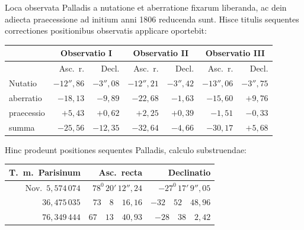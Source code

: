Loca observata Palladis a nutatione et aberratione fixarum liberanda, ac dein adiecta praecessione ad initium anni 1806 reducenda sunt. Hisce titulis sequentes correctiones positionibus observatis applicare oportebit:
\begin{center}
\begingroup\footnotesize\setlength{\tabcolsep}{4pt}\renewcommand{\arraystretch}{1.2}
\begin{tabular}{|l|r|r||r|r||r|r|}\hline
& \multicolumn{2}{c||}{Observatio I} & \multicolumn{2}{c||}{Observatio II} & \multicolumn{2}{c|}{Observatio III}\\\hline
& Asc.\ r. & Decl. & Asc.\ r. & Decl. & Asc.\ r. & Decl.\\\hline
Nutatio & $-12''{,}86$ & $-3''{,}08$ & $-12''{,}21$ & $-3''{,}42$ & $-13''{,}06$ & $-3''{,}75$\\
aberratio & $-18{,}13$ & $-9{,}89$ & $-22{,}68$ & $-1{,}63$ & $-15{,}60$ & $+9{,}76$\\
praecessio & $+5{,}43$ & $+0{,}62$ & $+2{,}25$ & $+0{,}39$ & $-1{,}51$ & $-0{,}33$\\\hline
summa & $-25{,}56$ & $-12{,}35$ & $-32{,}64$ & $-4{,}66$ & $-30{,}17$ & $+5{,}68$\\\hline
\end{tabular}\endgroup
\end{center}

Hinc prodeunt positiones sequentes Palladis, calculo substruendae:
\begin{center}
\begingroup\small\setlength{\tabcolsep}{6pt}\renewcommand{\arraystretch}{1.2}
\begin{tabular}{|r|r|r|}\hline
T.\ m.\ Parisinum & Asc.\ recta & Declinatio\\\hline
Nov.\ $5{,}574\,074$ & $78^{0}\,20'\,12''{,}24$ & $-27^{0}\,17'\,9''{,}05$\\
$36{,}475\,035$ & $73\quad8\quad16{,}16$ & $-32\quad52\quad48{,}96$\\
$76{,}349\,444$ & $67\quad13\quad40{,}93$ & $-28\quad38\quad2{,}42$\\\hline
\end{tabular}\endgroup
\end{center}

